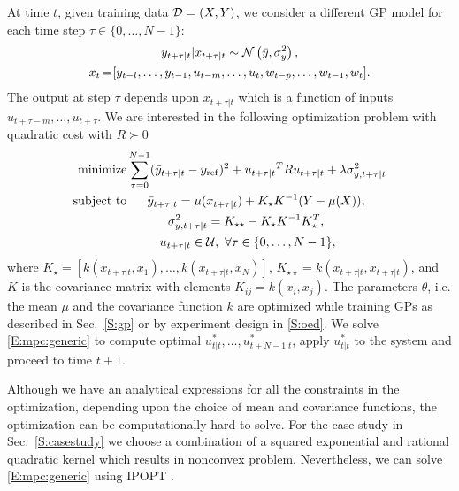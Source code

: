 At time \(t\), given training data \(\mathcal{D} = (X,Y) \), we consider a different GP model for each time step \(\tau \in \{0,\dots,N-1\}\):
\begin{gather}
y_{t+\tau|t} | x_{t+\tau|t} \sim \operatorname*{\mathcal{N}}\left(\bar{y}, \sigma^2_y\right), \\
x_{t}\!=\![y_{t-l}, \dots, y_{t-1}, u_{t-m}, \dots, u_t, w_{t-p}, \dots, w_{t-1}, w_t]. \nonumber
\end{gather}
The output at step \(\tau\) depends upon \(x_{t+\tau|t}\)  which is a function of inputs \(u_{t+\tau-m}, \dots, u_{t+\tau}\).
We are interested in the following optimization problem with quadratic cost with \(R \succ 0\)
\begin{align}
\label{E:mpc:generic}
\minimize & \sum_{\tau=0}^{N-1} (\bar{y}_{t+\tau|t}-y_{\mathrm{ref}})^2 + {u_{t+\tau|t}}^T R {u_{t+\tau|t}}+ \lambda \sigma^2_{y,t+\tau|t} \nonumber \\
\st & \ \ \ \ \ \bar{y}_{t+\tau|t} = \mu(x_{t+\tau|t}) + K_\star K^{-1} (Y - \mu(X)), \nonumber\\
& \ \ \ \ \ \ \ \ \ \ \sigma^2_{y,t+\tau|t} = K_{\star \star} - K_\star K^{-1} K_\star^T, \\
& \ \ \ \ \ \ \ \  u_{t+\tau|t} \in \mathcal{U}, \  \forall \tau \in \{0,\dots,N-1\}, \nonumber
\end{align}
where \(K_\star = [k(x_{t+\tau|t}, x_1), \dots, k(x_{t+\tau|t}, x_N)]\), \(K_{\star \star} = k(x_{t+\tau|t}, x_{t+\tau|t})\), and $K$ is the covariance matrix with elements \(K_{ij} = k(x_i, x_j)\). The parameters \(\theta\), i.e. the mean \(\mu\) and the covariance function \(k\) are optimized while training GPs as described in Sec.~\ref{S:gp} or by experiment design in \ref{S:oed}. We solve \eqref{E:mpc:generic} to compute optimal \(u_{t|t}^*, \dots, u_{t+N-1|t}^*\), apply \(u_{t|t}^*\) to the system and proceed to time \(t+1\).

Although we have an analytical expressions for all the constraints in the optimization, depending upon the choice of mean and covariance functions, the optimization can be computationally hard to solve. For the case study in Sec.~\ref{S:casestudy} we choose a combination of a squared exponential and rational quadratic kernel which results in nonconvex problem. Nevertheless, we can solve \eqref{E:mpc:generic} using IPOPT \cite{Waechter2009b}.